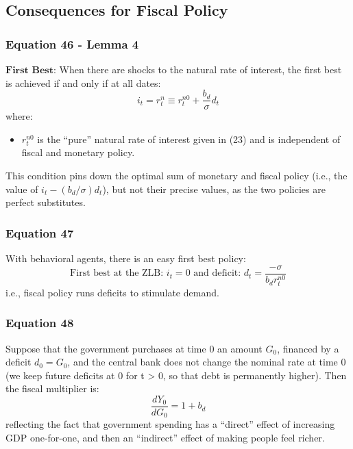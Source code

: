 \documentclass{article}
\begin{document}
\subsection{Consequences for Fiscal Policy}

\subsubsection*{Equation 46 - Lemma 4}
$\textbf{First Best}$: When there are shocks to the natural rate of interest, the first best is achieved if and only if at all dates:
\begin{equation}\tag{46}
    i_{t}=r_{t}^{n}\equiv r_{t}^{n0}+\frac{b_{d}}{\sigma}d_{t}
\end{equation}
where:
\begin{itemize}
    \item $r_{t}^{n0}$ is the “pure” natural rate of interest given in (23) and is independent of fiscal and monetary policy.
\end{itemize}
This condition pins down the optimal sum of monetary
and fiscal policy (i.e., the value of $i_{t}-(b_{d}/\sigma)d_{t}$), but not their precise values, as the two policies are perfect substitutes.

\subsubsection*{Equation 47}
With behavioral agents, there is an easy first best policy:
\begin{equation}\tag{47}
    \text{First best at the ZLB: } i_{t}=0 \text{ and deficit: } d_{t}=\frac{-\sigma}{b_{d}r_{t}^{n0}}
\end{equation}
i.e., fiscal policy runs deficits to stimulate demand.

\subsubsection*{Equation 48}
Suppose that the government purchases at time 0 an amount $G_{0}$, financed by a deficit $d_{0}=G_{0}$, and the central bank does not change the nominal
rate at time 0 (we keep future deficits at 0 for t > 0, so that debt is permanently higher). Then the fiscal multiplier is:
\begin{equation}\tag{48}
    \frac{d Y_{0}}{d G_{0}}=1+b_{d}
\end{equation}
reflecting the fact that government spending has a “direct” effect of increasing GDP one-for-one, and then an “indirect” effect of making people feel richer.
\end{document}
